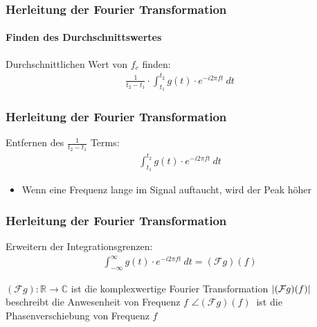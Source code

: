 \begin{frame}
    \frametitle{Herleitung der Fourier Transformation}
    \framesubtitle{Finden des Durchschnittswertes}
    Durchschnittlichen Wert von $f_c$ finden:
    \begin{align*}
        \frac{1}{t_2-t_1}\cdot \int_{t_1}^{t_2}{g(t)\cdot e^{-i2\pi f t}\ dt}
    \end{align*}
    \frametitle{Herleitung der Fourier Transformation}
    Entfernen des $\frac{1}{t_2-t_1}$ Terms:
    \begin{align*}
    \int_{t_1}^{t_2}{g(t)\cdot e^{-i2\pi f t}\ dt}
    \end{align*}
    \begin{itemize}
        \item Wenn eine Frequenz lange im Signal auftaucht, wird der Peak höher
    \end{itemize}
\end{frame}

\begin{frame}
    \frametitle{Herleitung der Fourier Transformation}
    Erweitern der Integrationsgrenzen:
    \begin{align*}
        \int_{-\infty}^{\infty}{g(t)\cdot e^{-i2\pi f t}\ dt}=(\mathcal{F}g)(f)
    \end{align*}

    \vspace{10px}
    \begin{tcolorbox}[colback=red!5!white,colframe=red!75!black,title=Wichtig]
        $(\mathcal{F} g):\mathbb{R}\rightarrow\mathbb{C}$ ist die komplexwertige Fourier Transformation\newline
        $\abs{(\mathcal{F} g)(f)}\ $ beschreibt die Anwesenheit von Frequenz $f$\newline
         $\angle (\mathcal{F} g)(f)\ $ ist die Phasenverschiebung von Frequenz $f$
    \end{tcolorbox}
\end{frame}

